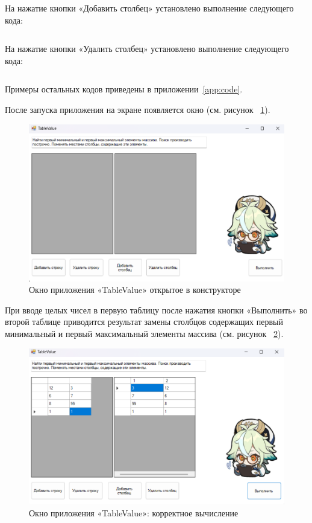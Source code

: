 \documentclass[bachelor, och, pract, times]{SCWorks}
\begin{document}
На нажатие кнопки «Добавить столбец» установлено выполнение следующего кода:\inputminted[fontsize=\footnotesize]{cpp}{КодТаблица2/AddCol.cpp}

На нажатие кнопки «Удалить столбец» установлено выполнение следующего кода:\inputminted[fontsize=\footnotesize]{cpp}{КодТаблица2/DeleteCol.cpp}



Примеры остальных кодов приведены в приложении~\ref{app:code}.

После запуска приложения на экране появляется окно (см. рисунок ~\ref{fig:table2-02}).

\begin{figure}[H]
    \centering
    \includegraphics[scale=0.5]{Скрины/Снимок экрана 2025-01-05 121321.png}
    \caption{Окно приложения «TableValue» открытое в
конструкторе}\label{fig:table2-02}
\end{figure}

При вводе целых чисел в первую таблицу после нажатия кнопки «Выполнить» во второй таблице приводится результат замены столбцов содержащих первый минимальный и первый максимальный элементы массива  (см. рисунок ~\ref{fig:table2-03}).

\begin{figure}[H]
    \centering
    \includegraphics[scale=0.5]{Скрины/Снимок экрана 2025-01-05 121530.png}
    \caption{Окно приложения «TableValue»: корректное вычисление}\label{fig:table2-03}
\end{figure}
\end{document}
